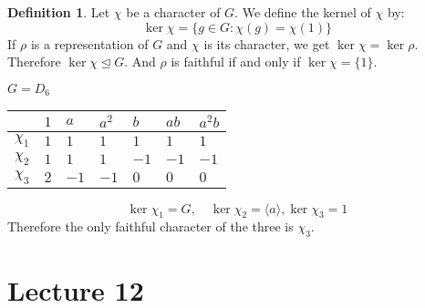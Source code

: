 \documentclass[11pt, notitlepage]{article}
\numberwithin{equation}{section}
\theoremstyle{plain}
\theoremstyle{definition}
\newtheorem{definition}[theorem]{Definition}
\newenvironment{example}
	{\pushQED{\qed}\renewcommand{\qedsymbol}{$\blacktriangleleft$}\examplex}
	{\popQED\endexamplex}
\begin{document}
\begin{definition}
	Let $\chi$ be a character of $G$. We define the kernel of $\chi$ by:
	\[
	\ker\chi = \{g\in G:\chi(g) = \chi(1)\}
	\]
	If $\rho$ is a representation of $G$ and $\chi$ is its character, we get $\ker\chi = \ker\rho$. Therefore $\ker\chi\unlhd G$. And $\rho$ is faithful if and only if $\ker\chi = \{1\}$.
\end{definition}
\begin{example}
	$G = D_6$

\begin{tabular}{l|l|l|l|l|l|l|}
	& $1$ & $a$  & $a^2$ & $b$  & $ab$ & $a^2b$  \\ 
	\hline
	$\chi_1$ & $1$ & $1$  & $1$   & $1$  & $1$  & $1$     \\ 
	\hline
	$\chi_2$ & $1$ & $1$  & $1$   & $-1$ & $-1$ & $-1$    \\ 
	\hline
	$\chi_3$ & $2$ & $-1$ & $-1$  & $0$  & $0$  & $0$     \\
	\hline
\end{tabular}
\[\ker\chi_1 = G,\quad \ker\chi_2 = \langle a\rangle, \ker\chi_3 = 1\]
Therefore the only faithful character of the three is $\chi_3$.
\end{example}





\section{Lecture 12}
\end{document}
